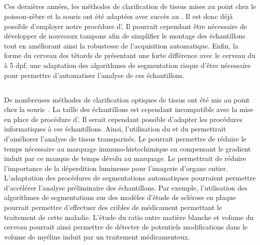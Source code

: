 \documentclass[\main/main.tex]{subfiles}
\begin{document}
    \subsection{\xl}
%
Ces dernières années, les méthodes de clarification de tissus mises au point chez le poisson-zèbre et la souris ont été adaptées avec succès au \xl{}\cite{fini_2017,affaticati_2018}.
%
Il est donc déjà possible d'employer notre procédure d'\hti.
%
Il pourrait cependant être nécessaire de développer de nouveaux tampons afin de simplifier le montage des échantillons
tout en améliorant ainsi la robustesse de l'acquisition automatique.
%
Enfin, la forme du cerveau des têtards de \xl présentant une forte différence avec le cerveau du \pz à 5 dpf,
une adaptation des algorithmes de segmentation risque d'être nécessaire pour permettre d'automatiser l'analyse de ces échantillons.

    \subsection{\mm}
    
De nombreuses méthodes de clarification optiques de tissus ont été mis au point chez la souris~\cite{tainaka_2018,tomer_2015}.
%
La taille des échantillons est cependant incompatible avec la mise en place de procédure d'\hti{}.
%
Il serait cependant possible d'adapter les procédures informatiques à ces échantillons.
%
Ainsi, l'utilisation du \sbddcc{} et du \sblc{} permettrait d'améliorer l'analyse de tissus transparisés.
%
Le \sblc{} pourrait permettre de réduire le temps nécessaire au marquage immuno-histochimique en compensant le gradient induit par ce manque de temps dévolu au marquage.
%
Le \sbddcc{} permettrait de réduire l'importance de la déperdition lumineuse pour l'imagerie d'organe entier.
%
L'adaptation des procédures de segmentations automatiques pourraient permettre d'accélérer l'analyse préliminaire des échantillons.
%
Par exemple, l'utilisation des algorithmes de segmentations sur des modèles d'étude de sclérose en plaque pourrait permettre d'effectuer des cribles de médicament permettant le traitement de cette maladie.
%
L'étude du ratio entre matière blanche et volume du cerveau pourrait ainsi permettre de détecter de potentiels modifications dans le volume de myéline induit par un traitement médicamenteux.
\end{document}
